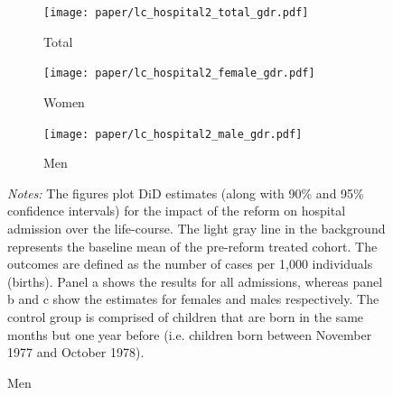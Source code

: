 \documentclass[11pt, a4paper,draft]{article} %
\begin{document}
\newpage
\begin{landscape}
	\vspace*{\fill}
	\begin{figure}[H]\centering
		\caption{Life-course approach for \textbf{hospital admission}}\label{fig: lc_hospital2_frg_DD}
		\begin{subfigure}[h]{0.31\linewidth}\centering\caption{Total}
			\texttt{[image: paper/lc\_hospital2\_total\_gdr.pdf]}
		\end{subfigure}
		\begin{subfigure}[h]{0.31\linewidth}\centering\caption{Women}
			\texttt{[image: paper/lc\_hospital2\_female\_gdr.pdf]}
		\end{subfigure}
		\begin{subfigure}[h]{0.31\linewidth}\centering\caption{Men}
			\texttt{[image: paper/lc\_hospital2\_male\_gdr.pdf]}
		\end{subfigure}
		\scriptsize
		\begin{minipage}{\linewidth}
			\emph{Notes:} The figures plot DiD estimates (along with 90\% and 95\% confidence intervals) for the impact of the reform on hospital admission over the life-course. The light gray line in the background represents the baseline mean of the pre-reform treated cohort. The outcomes are defined as the number of cases per 1,000 individuals (births). Panel a shows the results for all admissions, whereas panel b and c show the estimates for females and males respectively. The control group is comprised of children	that are born in the same months but one year before (i.e. children born between November 1977 and October 1978).
		\end{minipage}
	\end{figure}
	\vspace*{\fill}\clearpage
\end{landscape}
%

\end{document}
